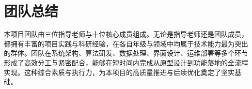 \section{团队总结}
本项目团队由三位指导老师与十位核心成员组成。无论是指导老师还是团队成员，都拥有丰富的项目实践与科研经验，在各自年级与领域中均属于技术能力最为突出的群体。团队在系统架构、算法研发、数据处理、界面设计、运维部署等多个环节形成了高效分工与紧密配合，能够在短时间内完成从原型设计到功能落地的全流程实现。这种综合素质与执行力，为本项目的高质量推进与后续优化奠定了坚实基础。